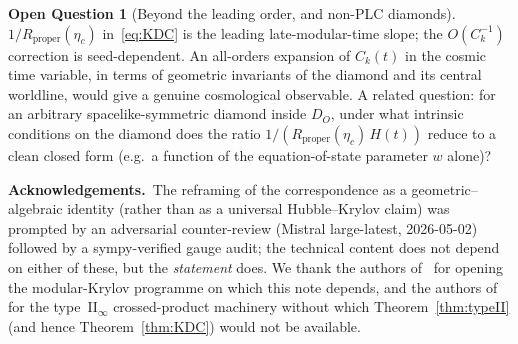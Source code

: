 \documentclass[11pt]{article}
\theoremstyle{definition}
\newtheorem{question}[theorem]{Open Question}
\newcommand{\Rprop}{R_{\mathrm{proper}}}
\begin{document}
\begin{question}[Beyond the leading order, and non-PLC diamonds]\label{q:allorders}
$1/\Rprop(\eta_c)$ in~\eqref{eq:KDC} is the leading
late-modular-time slope; the $O(C_k^{-1})$ correction is
seed-dependent. An all-orders expansion of $C_k(t)$ in the cosmic
time variable, in terms of geometric invariants of the diamond and
its central worldline, would give a genuine cosmological
observable. A related question: for an arbitrary spacelike-symmetric
diamond inside $D_O$, under what intrinsic conditions on the
diamond does the ratio $1/(\Rprop(\eta_c)\,H(t))$ reduce to a clean
closed form (e.g.\ a function of the equation-of-state parameter
$w$ alone)?
\end{question}

\medskip

\noindent\textbf{Acknowledgements.}~The reframing of the
correspondence as a geometric--algebraic identity (rather than as a
universal Hubble--Krylov claim) was prompted by an adversarial
counter-review (Mistral large-latest, 2026-05-02) followed by a
sympy-verified gauge audit; the technical content does not depend
on either of these, but the \emph{statement} does. We thank the
authors of~\cite{CMPT24, AguilarGutierrez2025} for opening the
modular-Krylov programme on which this note depends, and the authors
of~\cite{CLPW2023, Witten2022} for the type~II$_\infty$
crossed-product machinery without which Theorem~\ref{thm:typeII}
(and hence Theorem~\ref{thm:KDC}) would not be available.



\end{document}
